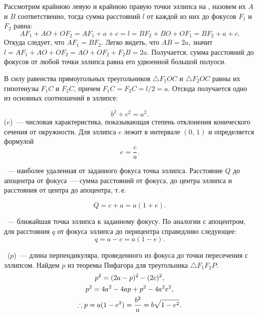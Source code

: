 Рассмотрим крайнюю левую и крайнюю правую точки эллипса на , назовем их $A$ и $B$ соответственно, тогда сумма расстояний $l$ от каждой из них до фокусов $F_1$ и $F_2$ равна:
\begin{equation*}
    AF_1 + AO + OF_2 = AF_1 + a + c = l = BF_2 + BO + OF_1 = BF_2 + a + c.
\end{equation*}
Откуда следует, что $A F_1 = B F_2$. Легко видеть, что $AB = 2a$, значит $l = AF_1 + AO + OF_2 = AO + OF_2 + F_2B = 2a$. Получается, сумма расстояний до фокусов от любой точки эллипса равна его удвоенной большой полуоси.

В силу равенства прямоугольных треугольников $\triangle F_1 O C$ и $\triangle F_2 O C$ равны их гипотенузы $F_1C$ и $F_2C$, причем $F_1C= F_2C = l/2 = a$. Отсюда получается одно из основных соотношений в эллипсе:

\begin{equation}
    b^2 + c^2 = a^2.
\end{equation}
 ($e$)~--- числовая
характеристика, показывающая степень отклонения конического сечения от окружности. Для эллипса $e$ лежит в интервале $(0, \, 1)$ и
определяется формулой
\begin{equation}
    e = \frac{c}{a}.
\end{equation}

~--- наиболее удаленная от заданного фокуса точка эллипса. Расстояние $Q$ до апоцентра от фокуса~--- сумма расстояний от фокуса, до центра эллипса и расстояния от центра до апоцентра, т.\,е.

\begin{equation}
    Q = c + a = a (1 + e).
\end{equation}

~--- ближайшая точка эллипса к заданному фокусу. По аналогии с апоцентром, для расстояния $q$ от фокуса эллипса до перицентра справедливо следующее:
\begin{equation}
    q = a - c = a (1 - e).
\end{equation}

~($p$)~--- длина перпендикуляра, проведенного из фокуса до точки пересечения с эллипсом. Найдем $p$ из теоремы Пифагора для треугольника $\triangle F_1 F_2 P$:
\begin{gather}
    p^2 = (2a - p)^2 - (2c)^2, \notag\\
    p^2 =  4a^2 - 4ap + p^2 - 4a^2e^2,\notag\\
    \therefore p = a (1 - e^2) = \frac{b^2}{a} = b \sqrt{1 - e^2}.
\end{gather}


